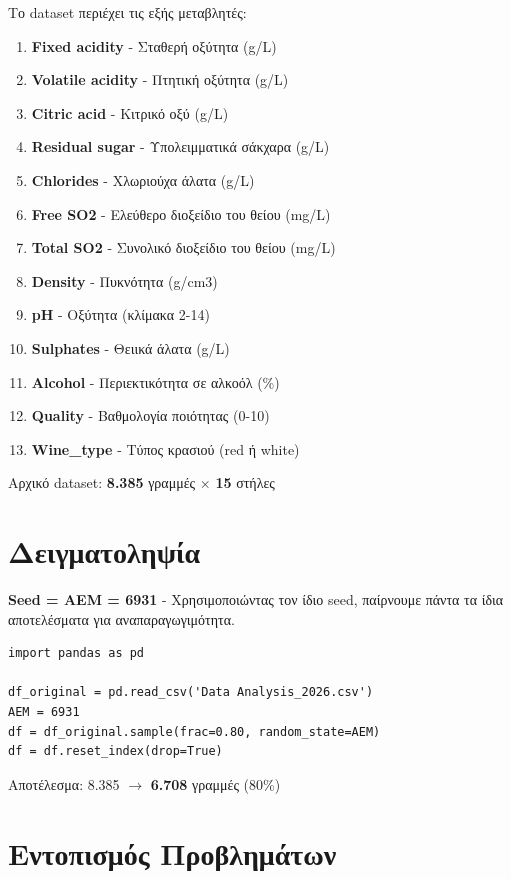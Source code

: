 \documentclass[12pt,a4paper]{article}
\begin{document}
Το dataset περιέχει τις εξής μεταβλητές:

\begin{enumerate}
    \item \textbf{Fixed acidity} - Σταθερή οξύτητα (g/L)
    \item \textbf{Volatile acidity} - Πτητική οξύτητα (g/L)
    \item \textbf{Citric acid} - Κιτρικό οξύ (g/L)
    \item \textbf{Residual sugar} - Υπολειμματικά σάκχαρα (g/L)
    \item \textbf{Chlorides} - Χλωριούχα άλατα (g/L)
    \item \textbf{Free SO2} - Ελεύθερο διοξείδιο του θείου (mg/L)
    \item \textbf{Total SO2} - Συνολικό διοξείδιο του θείου (mg/L)
    \item \textbf{Density} - Πυκνότητα (g/cm3)
    \item \textbf{pH} - Οξύτητα (κλίμακα 2-14)
    \item \textbf{Sulphates} - Θειικά άλατα (g/L)
    \item \textbf{Alcohol} - Περιεκτικότητα σε αλκοόλ (\%)
    \item \textbf{Quality} - Βαθμολογία ποιότητας (0-10)
    \item \textbf{Wine\_type} - Τύπος κρασιού (red ή white)
\end{enumerate}

Αρχικό dataset: \textbf{8.385} γραμμές $\times$ \textbf{15} στήλες

\section{Δειγματοληψία}

\textbf{Seed = AEM = 6931} - Χρησιμοποιώντας τον ίδιο seed, παίρνουμε πάντα τα ίδια αποτελέσματα για αναπαραγωγιμότητα.

\begin{lstlisting}
import pandas as pd

df_original = pd.read_csv('Data Analysis_2026.csv')
AEM = 6931
df = df_original.sample(frac=0.80, random_state=AEM)
df = df.reset_index(drop=True)
\end{lstlisting}

Αποτέλεσμα: 8.385 $\rightarrow$ \textbf{6.708} γραμμές (80\%)

\section{Εντοπισμός Προβλημάτων}
\end{document}
